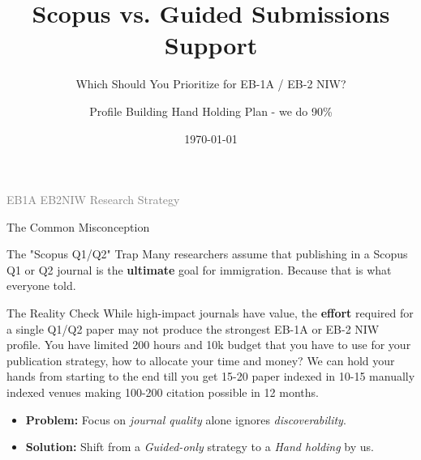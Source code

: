 \documentclass[10pt, aspectratio=169]{beamer}
\title[Publication Strategy for EB-1A/NIW]{\textbf{Scopus vs. Guided Submissions Support}}
\subtitle{Which Should You Prioritize for EB-1A / EB-2 NIW?}
\author[Profile Building]{Profile Building Hand Holding Plan - we do 90\%}
\institute[EB1A Course]{EB1A Profile Building Strategy Course by Shivgan Joshi}
\date{\today}
\begin{document}
	
	\begin{frame}
		\titlepage
		\begin{center}
			\tiny{\textcolor{gray}{EB1A EB2NIW Research Strategy}}
		\end{center}
	\end{frame}
	
	\begin{frame}{The Common Misconception}
		\begin{block}{The "Scopus Q1/Q2" Trap}
			Many researchers assume that publishing in a Scopus Q1 or Q2 journal is the \textbf{ultimate} goal for immigration. Because that is what everyone told.
		\end{block}
		\vspace{0.5cm}
		\begin{alertblock}{The Reality Check}
			While high-impact journals have value, the \textbf{effort} required for a single Q1/Q2 paper may not produce the strongest EB-1A or EB-2 NIW profile. You have limited 200 hours and 10k budget that you have to use for your publication strategy, how to allocate your time and money? We can hold your hands from starting to the end till you get 15-20 paper indexed in 10-15 manually indexed venues making 100-200 citation possible in 12 months.
		\end{alertblock}
		\vspace{0.3cm}
		\begin{itemize}
			\item \textbf{Problem:} Focus on \textit{journal quality} alone ignores \textit{discoverability}.
			\item \textbf{Solution:} Shift from a \textit{Guided-only} strategy to a \textit{Hand holding} by us.
		\end{itemize}
	\end{frame}
	
\end{document}
